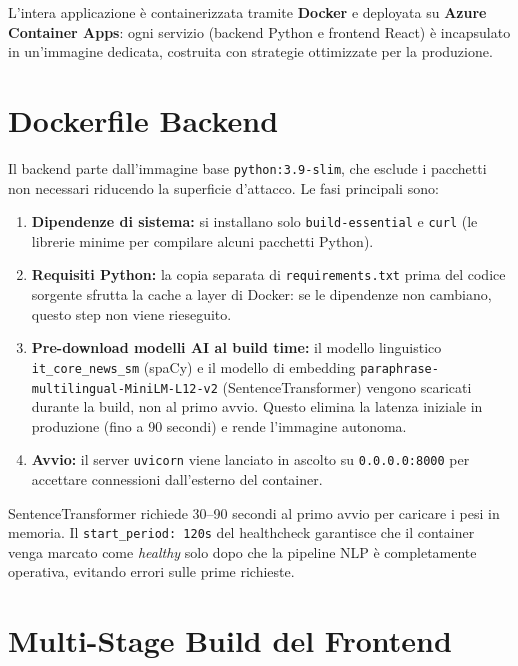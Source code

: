 \documentclass[12pt,a4paper,oneside]{report}
\begin{document}
L'intera applicazione \`{e} containerizzata tramite \textbf{Docker} e deployata su
\textbf{Azure Container Apps}: ogni servizio (backend Python e frontend React) \`{e}
incapsulato in un'immagine dedicata, costruita con strategie ottimizzate per la produzione.

\section{Dockerfile Backend}

Il backend parte dall'immagine base \texttt{python:3.9-slim}, che esclude i pacchetti
non necessari riducendo la superficie d'attacco. Le fasi principali sono:

\begin{enumerate}
    \item \textbf{Dipendenze di sistema:} si installano solo \texttt{build-essential}
          e \texttt{curl} (le librerie minime per compilare alcuni pacchetti Python).
    \item \textbf{Requisiti Python:} la copia separata di \texttt{requirements.txt}
          prima del codice sorgente sfrutta la cache a layer di Docker: se le dipendenze
          non cambiano, questo step non viene rieseguito.
    \item \textbf{Pre-download modelli AI al build time:} il modello linguistico
          \texttt{it\_core\_news\_sm} (spaCy) e il modello di embedding
          \texttt{paraphrase-multilingual-MiniLM-L12-v2} (SentenceTransformer) vengono
          scaricati durante la build, non al primo avvio. Questo elimina la latenza
          iniziale in produzione (fino a 90 secondi) e rende l'immagine autonoma.
    \item \textbf{Avvio:} il server \texttt{uvicorn} viene lanciato in ascolto su
          \texttt{0.0.0.0:8000} per accettare connessioni dall'esterno del container.
\end{enumerate}

\begin{notabox}[title={Il ruolo del healthcheck Docker}]
SentenceTransformer richiede 30--90 secondi al primo avvio per caricare i pesi in
memoria. Il \texttt{start\_period: 120s} del healthcheck garantisce che il container
venga marcato come \textit{healthy} solo dopo che la pipeline NLP \`{e} completamente
operativa, evitando errori sulle prime richieste.
\end{notabox}

\section{Multi-Stage Build del Frontend}
\end{document}
